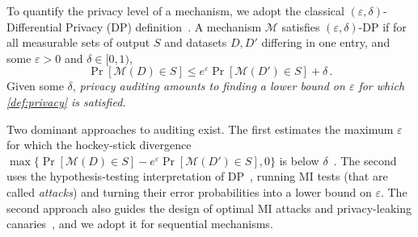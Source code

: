 \documentclass{article}
\theoremstyle{plain}
\theoremstyle{definition}
\theoremstyle{remark}
\newcommand{\cM}{\ensuremath{\mathcal{M}}}
\renewcommand{\epsilon}{\varepsilon}
\renewcommand{\leq}{\leqslant}
\begin{document}
To quantify the privacy level of a mechanism, we adopt the classical $(\varepsilon, \delta)$-Differential Privacy (DP) definition~\citep{dpbook}. A mechanism $\cM$ satisfies $(\varepsilon, \delta)$-DP if for all measurable sets of output $S$ and datasets $D, D'$ differing in one entry, and some $\varepsilon>0$ and $\delta \in [0,1)$,
\begin{equation}
    \Pr[\mathcal{M}(D) \in S] \leq e^\varepsilon \Pr[\mathcal{M}(D') \in S] + \delta\,. \label{def:privacy}
\end{equation}
Given some $\delta$, \textit{privacy auditing amounts to finding a lower bound on $\varepsilon$ for which \eqref{def:privacy} is satisfied.}

Two dominant approaches to auditing exist. The first estimates the maximum $\epsilon$ for which the hockey-stick divergence $\max\{\Pr[\cM(D) \in S] - e^\varepsilon \Pr[\cM(D') \in S], 0\}$ is below $\delta$~\citep{koskelaAuditingDifferentialPrivacy2024,basu2026sublinear}. The second uses the hypothesis-testing interpretation of DP~\citep{wasserman2010statistical, kairouz2015composition}, running MI tests (that are called \emph{attacks}) and turning their error probabilities into a lower bound on $\varepsilon$. The second approach also guides the design of optimal MI attacks and privacy-leaking canaries~\citep{nasrTightAuditingDifferentially2023,azizeTargetsAreHarder2025}, and we adopt it for sequential mechanisms.
\end{document}
